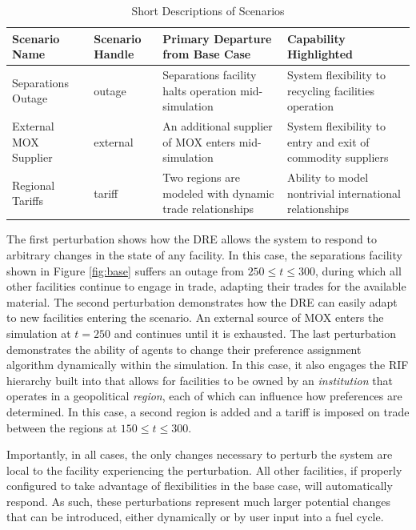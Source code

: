 \begin{table}[]
\centering
\caption{Short Descriptions of Scenarios}
\label{scenarios}
\begin{tabularx}{\textwidth}{|p{2cm}|p{2cm}|X|X|}
\hline
\textbf{Scenario  Name} & \textbf{Scenario Handle} & \textbf{Primary Departure from Base Case}                & \textbf{Capability Highlighted}                             \\ \hline
Separations Outage      & outage                   & Separations facility halts operation mid-simulation      & System flexibility to recycling facilities operation        \\ \hline
External MOX Supplier   & external                 & An additional supplier of MOX enters mid-simulation      & System flexibility to entry and exit of commodity suppliers \\ \hline
Regional Tariffs        & tariff                   & Two regions are modeled with dynamic trade relationships & Ability to model nontrivial international relationships     \\ \hline
\end{tabularx}
\end{table}

The first perturbation shows how the \gls{DRE} allows the system to respond to
arbitrary changes in the state of any facility.  In this case, the separations
facility shown in Figure \ref{fig:base} suffers an outage from $250 \leq t
\leq 300$, during which all other facilities continue to engage in trade,
adapting their trades for the available material.  The second perturbation
demonstrates how the \gls{DRE} can easily adapt to new facilities entering the
scenario.  An external source of MOX enters the simulation at $t = 250$ and
continues until it is exhausted.  The last perturbation demonstrates the
ability of agents to change their preference assignment algorithm dynamically
within the simulation.  In this case, it also engages the \gls{RIF} hierarchy
built into \Cyclus{} that allows for facilities to be owned by an
\textit{institution} that operates in a geopolitical \textit{region}, each of
which can influence how preferences are
determined.  In this case, a second region is
added and a tariff is imposed on trade between the regions at $150 \leq t \leq
300$.

Importantly, in all cases, the only changes necessary to perturb the system
are local to the facility experiencing the perturbation.  All other
facilities, if properly configured to take advantage of flexibilities in the
base case, will automatically respond.  As such, these perturbations represent
much larger potential changes that can be introduced, either dynamically or by
user input into a fuel cycle.

